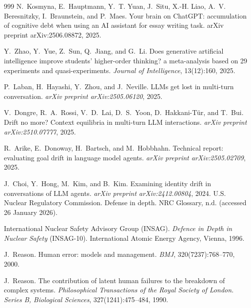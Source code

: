 \begin{thebibliography}{999}
N.~Kosmyna, E.~Hauptmann, Y.~T. Yuan, J.~Situ, X.-H. Liao, A.~V. Beresnitzky, I.~Braunstein, and P.~Maes.
\newblock Your brain on ChatGPT: accumulation of cognitive debt when using an AI assistant for essay writing task.
\newblock arXiv preprint arXiv:2506.08872, 2025.

Y.~Zhao, Y.~Yue, Z.~Sun, Q.~Jiang, and G.~Li.
\newblock Does generative artificial intelligence improve students' higher-order thinking? a meta-analysis based on 29 experiments and quasi-experiments.
\newblock \emph{Journal of Intelligence}, 13(12):160, 2025.

P.~Laban, H.~Hayashi, Y.~Zhou, and J.~Neville.
\newblock LLMs get lost in multi-turn conversation.
\newblock \emph{arXiv preprint arXiv:2505.06120}, 2025.

V.~Dongre, R.~A.~Rossi, V.~D.~Lai, D.~S.~Yoon, D.~Hakkani-T\"ur, and T.~Bui.
\newblock Drift no more? Context equilibria in multi-turn LLM interactions.
\newblock \emph{arXiv preprint arXiv:2510.07777}, 2025.

R.~Arike, E.~Donoway, H.~Bartsch, and M.~Hobbhahn.
\newblock Technical report: evaluating goal drift in language model agents.
\newblock \emph{arXiv preprint arXiv:2505.02709}, 2025.

J.~Choi, Y.~Hong, M.~Kim, and B.~Kim.
\newblock Examining identity drift in conversations of LLM agents.
\newblock \emph{arXiv preprint arXiv:2412.00804}, 2024.
U.S. Nuclear Regulatory Commission.
\newblock Defense in depth.
\newblock NRC Glossary, n.d. (accessed 26 January 2026).

International Nuclear Safety Advisory Group (INSAG).
\newblock \emph{Defence in Depth in Nuclear Safety} (INSAG-10).
\newblock International Atomic Energy Agency, Vienna, 1996.

J.~Reason.
\newblock Human error: models and management.
\newblock \emph{BMJ}, 320(7237):768--770, 2000.

J.~Reason.
\newblock The contribution of latent human failures to the breakdown of complex systems.
\newblock \emph{Philosophical Transactions of the Royal Society of London. Series B, Biological Sciences}, 327(1241):475--484, 1990.

\end{thebibliography}
